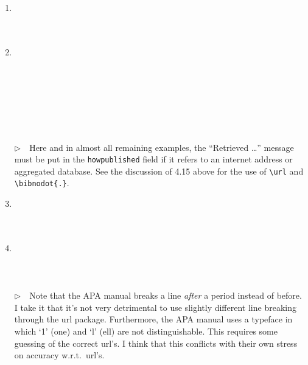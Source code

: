 \documentclass{article}
\newcommand{\bibnodot}[1]{}
\newcommand{\EM}{\ensuremath{\triangleright\quad}}
\newcommand{\pkg}[1]{\textsf{#1}}%
\newcommand{\fname}[1]{\texttt{#1}}%
\newcommand{\fieldname}[1]{\texttt{#1}}%
\begin{document}
\begin{enumerate}
      Note that this is all trickery within the \LaTeX{} domain
      and the \fname{.bib} file, i.e., the user-definable and
      user-customizable area.
\item \cite{ex70} \\ \cite{ex70}\\ \\ 
\item \cite{ex71-1} \\ \cite{ex71-1}\\ \\  \\
      \cite{ex71-2} \\ \cite{ex71-2}\\ \\  \\
      \EM Here and in almost all remaining examples, the
      ``Retrieved \ldots'' message must be put in the
      \fieldname{howpublished} field if it refers to an internet
      address or aggregated database. See the discussion of 4.15
      above for the use of \verb+\url+ and \verb+\bibnodot{.}+.
\item \cite{ex72} \\ \cite{ex72}\\ \\ 
\item \cite{ex73} \\ \cite{ex73}\\ \\  \\
      \EM Note that the APA manual breaks a line \emph{after} a
      period instead of before. I take it that it's not very
      detrimental to use slightly different line breaking through
      the \pkg{url} package. Furthermore, the APA manual uses a
      typeface in which `1' (one) and `l' (ell) are not distinguishable.
      This requires some guessing of the correct url's. I think that this
      conflicts with their own stress on accuracy w.r.t.\ url's.


\end{enumerate}
\end{document}
